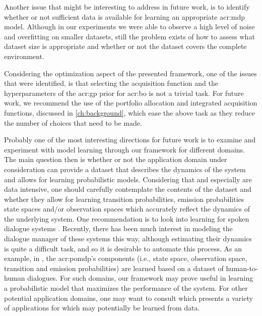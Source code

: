 Another issue that might be interesting to address in future work, is to identify whether or not sufficient data is available for learning an appropriate \acrshort{acr:mdp} model.
Although in our experiments we were able to observe a high level of noise and overfitting on smaller datasets, still the problem exists of how to assess what dataset size is appropriate and whether or not the dataset covers the complete environment.

Considering the optimization aspect of the presented framework, one of the issues that were identified, is that selecting the acquisition function and the hyperparameters of the \acrshort{acr:gp} prior for \acrshort{acr:bo} is not a trivial task.
For future work, we recommend the use of the portfolio allocation \cite{Hoffman2011, shahriari2016taking} and integrated acquisition \cite{snoek2012practical} functions, discussed in \autoref{ch:background}, which ease the above task as they reduce the number of choices that need to be made.

\newpage

Probably one of the most interesting directions for future work is to examine and experiment with model learning through our framework for different domains.
The main question then is whether or not the application domain under consideration can provide a dataset that describes the dynamics of the system and allows for learning probabilistic models.
Considering that  and especially  are data intensive, one should carefully contemplate the contents of the dataset and whether they allow for learning transition probabilities, emission probabilities state spaces and/or observation spaces which accurately reflect the dynamics of the underlying system.
One recommendation is to look into learning  for spoken dialogue systems \cite{chinaei2011, png2011bayesian, young2016}.
Recently, there has been much interest in modeling the dialogue manager of these systems this way, although estimating their dynamics is quite a difficult task, and so it is desirable to automate this process.
As an example, in \cite{chinaei2011}, the \acrshort{acr:pomdp}'s components (i.e., state space, observation space, transition and emission probabilities) are learned based on a dataset of human-to-human dialogues.
For such domains, our framework may prove useful in learning a probabilistic model that maximizes the performance of the system.
For other potential application domains, one may want to consult \cite{cassandra1998spa} which presents a variety of applications for  which may potentially be learned from data.

